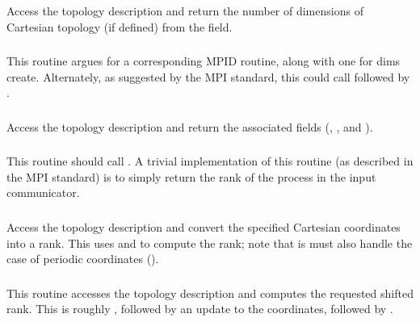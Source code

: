 \documentclass{article}
\begin{document}
\subsubsection{}
Access the topology description and return the number of dimensions of
Cartesian topology (if defined) from the 
field. 

\subsubsection{}
This routine argues for a corresponding MPID routine, along with one for dims
create. Alternately, as suggested by the MPI standard, this could call
 followed by .

\subsubsection{}
Access the topology description and return the associated fields
(, , and
). 

\subsubsection{}
This routine should call .  A trivial implementation
of this routine (as described in the MPI standard) is to simply return the
rank of the process in the input communicator.

\subsubsection{}
Access the topology description and convert the specified Cartesian
coordinates into a rank.  This uses  and
 to compute the rank; note that is must also
handle the case of periodic coordinates ().

\subsubsection{}
This routine accesses the topology description and computes the requested
shifted rank.  This is roughly , followed by an
update to the coordinates, followed by .  
\end{document}
